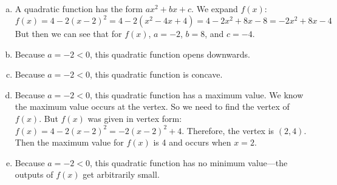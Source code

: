 \documentclass[11pt,letterpaper]{article}
\begin{document}
\sol 
\begin{enumerate}[(a)]
\item A quadratic function has the form $ax^2 + bx + c$. We expand $f(x)$: 
	\[
	f(x)= 4 - 2(x - 2)^2= 4 - 2(x^2 - 4x + 4)= 4 - 2x^2 + 8x - 8= -2x^2 + 8x - 4
	\]
But then we can see that for $f(x)$, $a= -2$, $b= 8$, and $c= -4$. \pspace

\item Because $a= -2 < 0$, this quadratic function opens downwards. \pspace

\item Because $a= -2 < 0$, this quadratic function is concave. \pspace

\item Because $a= -2 < 0$, this quadratic function has a maximum value. We know the maximum value occurs at the vertex. So we need to find the vertex of $f(x)$. But $f(x)$ was given in vertex form: $f(x)= 4 - 2(x - 2)^2= -2(x - 2)^2 + 4$. Therefore, the vertex is $(2, 4)$. Then the maximum value for $f(x)$ is 4 and occurs when $x= 2$. 

\item Because $a= -2 < 0$, this quadratic function has no minimum value---the outputs of $f(x)$ get arbitrarily small. 
\end{enumerate}
\end{document}
